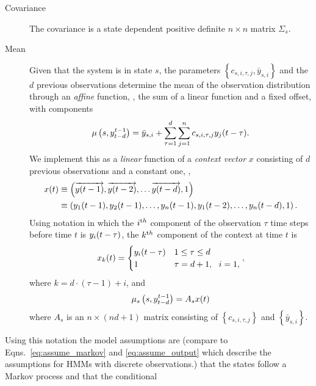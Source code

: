 \begin{description}
\item[Covariance] The covariance is a state dependent positive
  definite $n\times n$ matrix $\Sigma_s$.
\item[Mean] Given that the system is in state $s$, the parameters
  $\left\{ c_{s,i,\tau,j}, \bar y_{s,i} \right\}$ and the $d$ previous
  observations determine the mean of the observation distribution
  through an \emph{affine} function, \ie, the sum of a linear function
  and a fixed offset, with components
  \begin{equation}
    \label{eq:ARVGout1}
    \mu\left(s,y_{t-d}^{t-1}\right) = \bar y_{s,i} + \sum_{\tau =
    1}^d \sum_{j=1}^n c_{s,i,\tau,j} {y_j}{(t-\tau)}.
  \end{equation}
  We implement this as a \emph{linear} function of a \emph{context
    vector} $x$ consisting of $d$ previous observations and a constant
  one, \ie,
  \begin{align*}
    {x}{(t)} & \equiv \left( \overrightarrow{{y}{(t-1)}},
      \overrightarrow{{y}{(t-2)}},\ldots
      \overrightarrow{{y}{(t-d)}}, 1\right)\\
    & \equiv \left({y_1}{(t-1)}, {y_2}{(t-1)}, \ldots,
      {y_n}{(t-1)}, {y_1}{(t-2)}, \ldots, {y_n}{(t-d)}, 1 \right).
  \end{align*}
  Using notation in which the $i^{\text th}$ component of the observation
  $\tau$ time steps before time $t$ is ${y_i}{(t-\tau)}$, the $k^{\text th}$
  component of the context at time $t$ is
  \begin{equation}
    \label{eq:context}
    {x_{k}}{(t)} = \begin{cases} {y_i}{(t-\tau)} & 1\leq \tau \leq d
    \\ 1 & \tau = d+1,~~ i = 1, \end{cases},
  \end{equation}
  where $k=d\cdot(\tau-1) + i$, and
  \begin{equation}
    \label{eq:ARVGout2}
    \mu_s\left(s,y_{t-d}^{t-1}\right) = A_s {x}{(t)}
  \end{equation}
  where $A_s$ is an $n\times(nd+1)$ matrix consisting of $\left\{
    c_{s,i,\tau,j} \right\}$ and $\left\{ \bar y_{s,i} \right\}$.
\end{description}
Using this notation the model assumptions are (compare to
Eqns.~\eqref{eq:assume_markov} and \eqref{eq:assume_output} which
describe the assumptions for HMMs with discrete observations.) that
the states follow a Markov process and that the conditional
